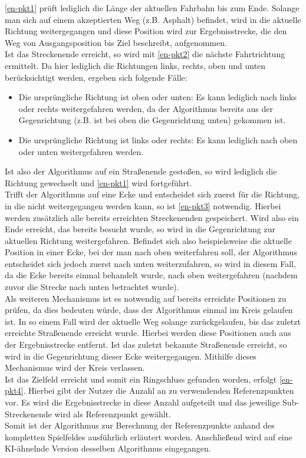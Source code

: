 \autoref{en-pkt1} prüft lediglich die Länge der aktuellen Fahrbahn bis zum Ende. Solange man sich auf einem akzeptierten Weg (z.B. Asphalt) befindet, wird in die aktuelle Richtung weitergegangen und diese Position wird zur Ergebnisstrecke, die den Weg von Ausgangsposition bis Ziel beschreibt, aufgenommen.\\
Ist das Streckenende erreicht, so wird mit \autoref{en-pkt2} die nächste Fahrtrichtung ermittelt. Da hier lediglich die Richtungen \glqq links\grqq{}, \glqq rechts\grqq{}, \glqq oben\grqq{} und \glqq unten\grqq{} berücksichtigt werden, ergeben sich folgende Fälle:
\begin{itemize}
\item Die ursprüngliche Richtung ist \glqq oben\grqq{} oder \glqq unten\grqq{}: Es kann lediglich nach \glqq links\grqq{} oder \glqq rechts\grqq{} weitergefahren werden, da der Algorithmus bereits aus der Gegenrichtung (z.B. ist bei \glqq oben\grqq{} die Gegenrichtung \glqq unten\grqq{}) gekommen ist.
\item Die ursprüngliche Richtung ist \glqq links\grqq{} oder \glqq rechts\grqq{}: Es kann lediglich nach \glqq oben\grqq{} oder \glqq unten\grqq{} weitergefahren werden.
\end{itemize}
Ist also der Algorithmus auf ein Straßenende gestoßen, so wird lediglich die Richtung gewechselt und \autoref{en-pkt1} wird fortgeführt.\\
Trifft der Algorithmus auf eine Ecke und entscheidet sich zuerst für die Richtung, in die nicht weitergegangen werden kann, so ist \autoref{en-pkt3} notwendig. Hierbei werden zusätzlich alle bereits erreichten Streckenenden gespeichert. Wird also ein Ende erreicht, das bereits besucht wurde, so wird in die Gegenrichtung zur aktuellen Richtung weitergefahren. Befindet sich also beispielsweise die aktuelle Position in einer Ecke, bei der man nach \glqq oben\grqq{} weiterfahren soll, der Algorithmus entscheidet sich jedoch zuerst nach \glqq unten\grqq{} weiterzufahren, so wird in diesem Fall, da die Ecke bereits einmal behandelt wurde, nach \glqq oben\grqq{} weitergefahren (nachdem zuvor die Strecke nach \glqq unten\grqq{} betrachtet wurde).\\
Als weiteren Mechanismus ist es notwendig auf bereits erreichte Positionen zu prüfen, da dies bedeuten würde, dass der Algorithmus einmal im Kreis gelaufen ist. In so einem Fall wird der aktuelle Weg solange zurückgelaufen, bis das zuletzt erreichte Straßenende erreicht wurde. Hierbei werden diese Positionen auch aus der Ergebnisstrecke entfernt. Ist das zuletzt bekannte Straßenende erreicht, so wird in die Gegenrichtung dieser Ecke weitergegangen. Mithilfe dieses Mechanismus wird der Kreis verlassen.\\
Ist das Zielfeld erreicht und somit ein Ringschluss gefunden worden, erfolgt \autoref{en-pkt4}. Hierbei gibt der Nutzer die Anzahl an zu verwendenden Referenzpunkten vor. Es wird die Ergebnisstrecke in diese Anzahl aufgeteilt und das jeweilige Sub-Streckenende wird als Referenzpunkt gewählt.\\
Somit ist der Algorithmus zur Berechnung der Referenzpunkte anhand des kompletten Spielfeldes ausführlich erläutert worden. Anschließend wird auf eine KI-ähnelnde Version desselben Algorithmus eingegangen.

